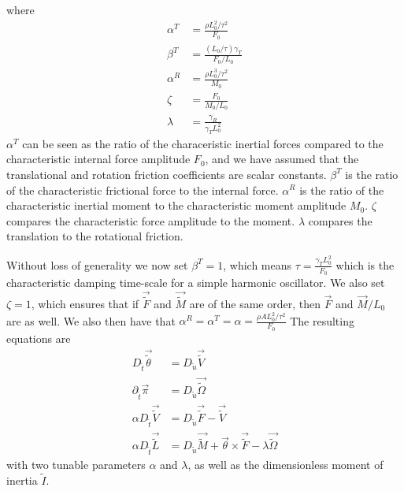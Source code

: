 \documentclass[]{cam-thesis}
\begin{document}
where
\begin{align*}
\alpha^{T} & =\frac{\rho L_{0}^{2}/\tau^{2}}{F_{0}}\\
\beta^{T} & =\frac{(L_{0}/\tau)\gamma_{T}}{F_{0}/L_{0}}\\
\alpha^{R} & =\frac{\rho L_{0}^{3}/\tau^{2}}{M_{0}}\\
\zeta & =\frac{F_{0}}{M_{0}/L_{0}}\\
\lambda & =\frac{\gamma_{R}}{\gamma_{T}L_{0}^{2}}
\end{align*}
$\alpha^{T}$ can be seen as the ratio of the characeristic inertial
forces compared to the characteristic internal force amplitude $F_{0}$, and we have assumed that the translational and rotation friction coefficients are scalar constants. $\beta^{T}$ is the ratio of the characteristic frictional force to
the internal force. $\alpha^{R}$ is the ratio of the characteristic
inertial moment to the characteristic moment amplitude $M_{0}$. $\zeta$
compares the characteristic force amplitude to the moment. $\lambda$
compares the translation to the rotational friction.

Without loss of generality we now set $\beta^{T}=1$, which means
$\tau=\frac{\gamma_{T}L_{0}^{2}}{F_{0}}$ which is the characteristic
damping time-scale for a simple harmonic oscillator. We also set $\zeta=1$,
which ensures that if $\vec{\tilde{F}}$ and $\vec{\tilde{M}}$ are
of the same order, then $\vec{F}$ and $\vec{M}/L_{0}$ are as well.
We also then have that $\alpha^{R}=\alpha^{T}=\alpha=\frac{\rho AL_{0}^{2}/\tau^{2}}{F_{0}}$
The resulting equations are
\begin{align}
D_{\tilde{t}}\vec{\tilde{\theta}} & =D_{\tilde{u}}\vec{\tilde{V}}\\
\partial_{\tilde{t}}\vec{\pi} & =D_{\tilde{u}}\vec{\tilde{\Omega}}\\
\alpha D_{\tilde{t}}\vec{\tilde{V}} & =D_{\tilde{u}}\vec{\tilde{F}}-\vec{\tilde{V}}\\
\alpha D_{\tilde{t}}\vec{\tilde{L}} & =D_{\tilde{u}}\vec{\tilde{M}}+\vec{\theta}\times\vec{\tilde{F}}-\lambda\vec{\tilde{\Omega}}
\end{align}
with two tunable parameters $\alpha$ and $\lambda$, as well as the
dimensionless moment of inertia $\tilde{I}$.
\end{document}

